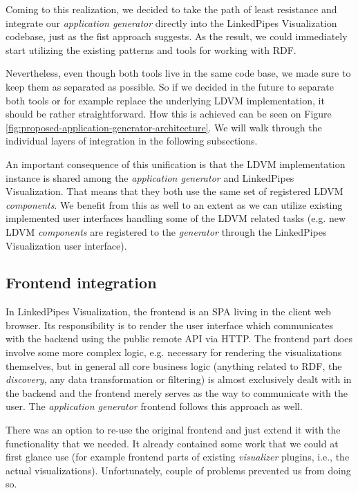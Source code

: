 Coming to this realization, we decided to take the path of least resistance and integrate our \emph{application generator} directly into the LinkedPipes Visualization codebase, just as the fist approach suggests. As the result, we could immediately start utilizing the existing patterns and tools for working with RDF. 

Nevertheless, even though both tools live in the same code base, we made sure to keep them as separated as possible. So if we decided in the future to separate both tools or for example replace the underlying LDVM implementation, it should be rather straightforward. How this is achieved can be seen on Figure \ref{fig:proposed-application-generator-architecture}. We will walk through the individual layers of integration in the following subsections.

An important consequence of this unification is that the LDVM implementation instance is shared among the \emph{application generator} and LinkedPipes Visualization. That means that they both use the same set of registered LDVM \emph{components}. We benefit from this as well to an extent as we can utilize existing implemented user interfaces handling some of the LDVM related tasks (e.g. new LDVM \emph{components} are registered to the \emph{generator} through the LinkedPipes Visualization user interface).

\subsection{Frontend integration}

In LinkedPipes Visualization, the frontend is an SPA living in the client web browser. Its responsibility is to render the user interface which communicates with the backend using the public remote API via HTTP. The frontend part does involve some more complex logic, e.g. necessary for rendering the visualizations themselves, but in general all core business logic (anything related to RDF, the \emph{discovery}, any data transformation or filtering) is almost exclusively dealt with in the backend and the frontend merely serves as the way to communicate with the user. The \emph{application generator} frontend follows this approach as well.

There was an option to re-use the original frontend and just extend it with the functionality that we needed. It already contained some work that we could at first glance use (for example frontend parts of existing \emph{visualizer} plugins, i.e., the actual visualizations). Unfortunately, couple of problems prevented us from doing so. 

